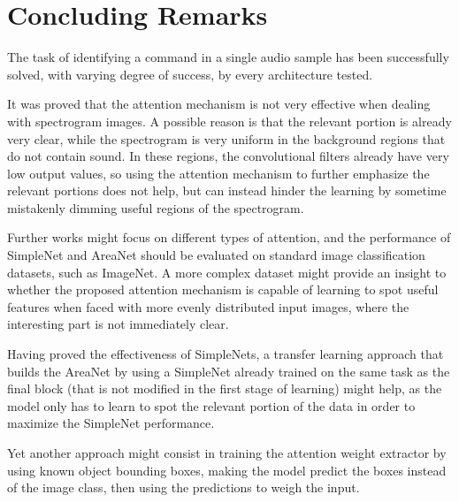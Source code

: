 
\section{Concluding Remarks}
\label{sec:conclusions}

The task of identifying a command in a single audio sample has been successfully
solved, with varying degree of success, by every architecture tested.

%
It was proved that the attention mechanism is not very effective when dealing
with spectrogram images.
%
A possible reason is that the relevant portion is already very clear, while the
spectrogram is very uniform in the background regions that do not contain
sound.
%
In these regions, the convolutional filters already have very low output
values, so using the attention mechanism to further emphasize the relevant
portions does not help, but can instead hinder the learning by sometime
mistakenly dimming useful regions of the spectrogram.

Further works might focus on different types of attention, and the performance
of SimpleNet and AreaNet should be evaluated on standard image classification
datasets, such as ImageNet.
%
A more complex dataset might provide an insight to whether the proposed
attention mechanism is capable of learning to spot useful features when faced
with more evenly distributed input images, where the interesting part is not
immediately clear.

%
Having proved the effectiveness of SimpleNets, a transfer learning approach
that builds the AreaNet by using a SimpleNet already trained on the same task
as the final block (that is not modified in the first stage of learning) might
help, as the model only has to learn to spot the relevant portion of the data
in order to maximize the SimpleNet performance.

Yet another approach might consist in training the attention weight extractor
by using known object bounding boxes, making the model predict the boxes
instead of the image class, then using the predictions to weigh the input.


